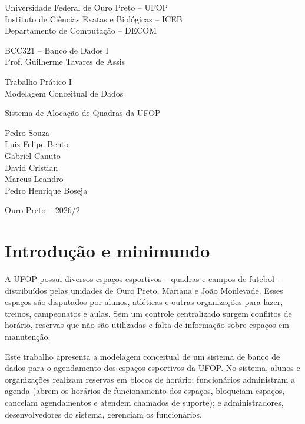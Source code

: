 \documentclass[11pt,a4paper]{article}
\begin{document}
\begin{titlepage}
  \centering
  {\large Universidade Federal de Ouro Preto -- UFOP\\
   Instituto de Ciências Exatas e Biológicas -- ICEB\\
   Departamento de Computação -- DECOM\par}
  \vspace{1.2cm}
  {\large BCC321 -- Banco de Dados I\\ Prof. Guilherme Tavares de Assis\par}
  \vspace{3cm}
  {\LARGE Trabalho Prático I\\[4pt] Modelagem Conceitual de Dados\par}
  \vspace{1cm}
  {\Large Sistema de Alocação de Quadras da UFOP\par}
  \vfill
  {\large
   Pedro Souza\\
   Luiz Felipe Bento\\
   Gabriel Canuto\\
   David Cristian\\
   Marcus Leandro\\
   Pedro Henrique Boseja\par}
  \vspace{2cm}
  {\large Ouro Preto -- 2026/2\par}
\end{titlepage}

\tableofcontents
\newpage

\section{Introdução e minimundo}


A UFOP possui diversos espaços esportivos -- quadras e campos de futebol --
distribuídos pelas unidades de Ouro Preto, Mariana e João Monlevade.
Esses espaços são disputados por alunos, atléticas e outras organizações para
lazer, treinos, campeonatos e aulas. Sem um controle centralizado surgem
conflitos de horário, reservas que não são utilizadas e falta de informação
sobre espaços em manutenção.

Este trabalho apresenta a modelagem conceitual de um sistema de banco de dados
para o agendamento dos espaços esportivos da UFOP. No sistema, alunos e
organizações realizam reservas em blocos de horário; funcionários
administram a agenda (abrem os horários de funcionamento dos espaços, bloqueiam espaços, cancelam
agendamentos e atendem chamados de suporte); e
administradores, desenvolvedores do sistema, gerenciam os funcionários.
\end{document}
